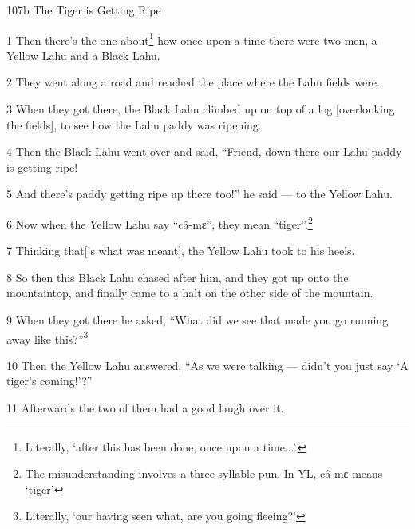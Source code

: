 
107b The Tiger is Getting Ripe

1 Then there's the one about\footnote{Literally, `after this has been done, once upon a time...'.} how once upon a time there were two men, a Yellow
Lahu and a Black Lahu.

2 They went along a road and reached the place where the Lahu fields were.

3 When they got there, the Black Lahu climbed up on top of a log [overlooking the
fields], to see how the Lahu paddy was ripening.

4 Then the Black Lahu went over and said, ``Friend, down there our Lahu paddy is
getting ripe!

5 And there's paddy getting ripe up there too!'' he said --- to the Yellow Lahu.

6 Now when the Yellow Lahu say ``câ-mɛ'', they mean ``tiger''.\footnote{The misunderstanding involves a three-syllable pun. In YL, câ-mɛ means `tiger'}

7 Thinking that['s what was meant], the Yellow Lahu took to his heels.

8 So then this Black Lahu chased after him, and they got up onto the mountaintop,
and finally came to a halt on the other side of the mountain.

9 When they got there he asked, ``What did we see that made you go running away
like this?''\footnote{Literally, `our having seen what, are you going fleeing?'}

10 Then the Yellow Lahu answered, ``As we were talking --- didn't you just say
`A tiger's coming!'?''

11 Afterwards the two of them had a good laugh over it.

